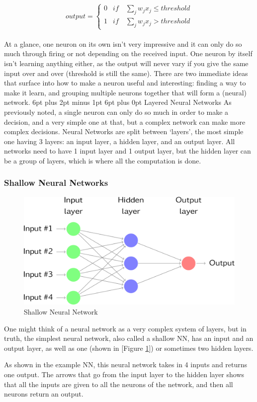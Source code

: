 \documentclass[12pt,a4paper]{article}
\makeatletter
\renewcommand\subsection{\@startsection {subsection}{1}{2mm} %
                               {6pt plus 2pt minus 1pt} %
                               {6pt plus 0pt} %
                               {\normalfont\bfseries}}
\makeatother
\begin{document}
\begin{equation}
 output =
    \begin{cases}
      0 & if \quad \sum_{j}^{} w_j x_j \leq threshold\\
      1 & if \quad \sum_{j}^{} w_j x_j > threshold
    \end{cases}
\label{eq:1}
\end{equation}
\\
At a glance, one neuron on its own isn’t very impressive and it can only do so much through firing or not depending on the received input. One neuron by itself isn’t learning anything either, as the output will never vary if you give the same input over and over (threshold is still the same). There are two immediate ideas that surface into how to make a neuron useful and interesting: finding a way to make it learn, and grouping multiple neurons together that will form a (neural) network. \cite{marsland_machine_2015}
\subsection{Layered Neural Networks}
As previously noted, a single neuron can only do so much in order to make a decision, and a very simple one at that, but a complex network can make more complex decisions. Neural Networks are split between ‘layers’, the most simple one having 3 layers: an input layer, a hidden layer, and an output layer. All networks need to have 1 input layer and 1 output layer, but the hidden layer can be a group of layers, which is where all the computation is done.
\subsubsection{Shallow Neural Networks}
\begin{figure}[ht]
	\includegraphics[width=\textwidth]{shallow}
	\centering
	\caption{Shallow Neural Network  \protect \cite{rob_j_hyndman_forecasting:_2018}}
	\label{fig:2}
\end{figure}
One might think of a neural network as a very complex system of layers, but in truth, the simplest neural network, also called a shallow NN, has an input and an output layer, as well as one (shown in [Figure \ref{fig:2}]) or sometimes two hidden layers.\par
As shown in the example NN, this neural network takes in 4 inputs and returns one output. The arrows that go from the input layer to the hidden layer shows that all the inputs are given to all the neurons of the network, and then all neurons return an output.
\end{document}
